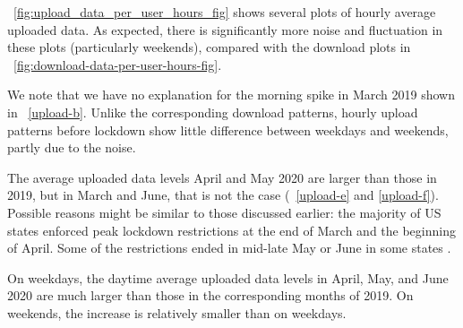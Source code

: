 \figurename~\ref{fig:upload_data_per_user_hours_fig} shows several plots of hourly average uploaded data. As expected, there is significantly more noise and fluctuation in these plots (particularly weekends), compared with the download plots in \figurename~\ref{fig:download-data-per-user-hours-fig}.

We note that we have no explanation for the morning spike in March 2019 shown in \figurename~\ref{upload-b}. Unlike the corresponding download patterns, hourly upload patterns before lockdown show little difference between weekdays and weekends, partly due to the noise.

 The average uploaded data levels April and May 2020 are larger than those in 2019, but in March and June, that is not the case (\figurename~\ref{upload-e} and \ref{upload-f}). Possible reasons might be similar to those discussed earlier: the majority of US states enforced peak lockdown restrictions at the end of March and the beginning of April. Some of the restrictions ended in mid-late May or June in some states \cite{covid19restriction}.

 On weekdays, the daytime average uploaded data levels in April, May, and June 2020 are much larger than those in the corresponding months of 2019. On weekends, the increase is relatively smaller than on weekdays.